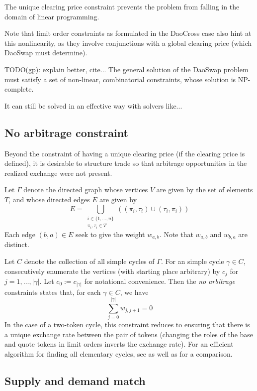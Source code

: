 \documentclass[11pt, reqno]{amsart}
\theoremstyle{definition}
\theoremstyle{remark}
\begin{document}
The unique clearing price constraint prevents the problem from falling in the
domain of linear programming.

Note that limit order constraints as formulated in the DaoCross case also hint
at this nonlinearity, as they involve conjunctions with a global clearing
price (which DaoSwap must determine).

TODO(gp): explain better, cite...
The general solution of the DaoSwap problem must satisfy a set of non-linear,
combinatorial constraints, whose solution is NP-complete.

It can still be solved in an effective way with solvers like...

\subsection{No arbitrage constraint}

Beyond the constraint of having a unique clearing price (if the clearing price
is defined), it is desirable to structure trade so that arbitrage opportunities
in the realized exchange were not present.

Let $\Gamma$ denote the directed graph whose vertices $V$ are given by the set
of elements $T$, and whose directed edges $E$ are given by
\[
    E = \bigcup_{\substack{i \in \{1, \ldots, n\} \\ \pi_i, \tau_i \in T}}
    \left( (\pi_i, \tau_i) \cup (\tau_i, \pi_i) \right)
\]
Each edge $(b, a) \in E$ seek to give the weight $w_{a, b}$. Note that
$w_{a, b}$ and $w_{b, a}$ are distinct.

Let $C$ denote the collection of all simple cycles of $\Gamma$.
For an simple cycle $\gamma \in C$, consecutively enumerate the vertices
(with starting place arbitrary) by $c_j$ for $j = 1, \ldots, |\gamma|$.
Let $c_0 := c_{|\gamma|}$ for notational convenience. Then
the \emph{no arbitrage} constraints states that, for each $\gamma \in C$, we have
\[
    \sum_{j = 0}^{|\gamma|} w_{j, j + 1} = 0
\]
In the case of a two-token cycle, this constraint reduces to ensuring that
there is a unique exchange rate between the pair of tokens (changing the roles
of the base and quote tokens in limit orders inverts the exchange rate).
For an efficient algorithm for finding all elementary cycles, see \cite{Jo75}
as well as \cite{MaDe76} for a comparison.

\subsection{Supply and demand match}
\end{document}
